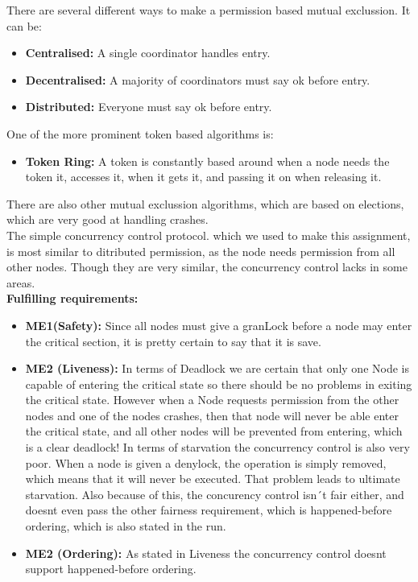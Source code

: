 There are several different ways to make a permission based mutual exclussion. It can be:
\begin{itemize}
\item \textbf{Centralised:} A single coordinator handles entry.
\item \textbf{Decentralised:} A majority of coordinators must say ok before entry.
\item \textbf{Distributed:} Everyone must say ok before entry. 
\end{itemize}  

One of the more prominent token based algorithms is:
\begin{itemize}
\item \textbf{Token Ring:} A token is constantly based around when a node needs the token it, accesses it, when it gets it, and passing it on when releasing it. 
\end{itemize} 

There are also other mutual exclussion algorithms, which are based on elections, which are very good at handling crashes. \\

The simple concurrency control protocol. which we used to make this assignment, is most similar to ditributed permission, as the node needs permission from all other nodes. Though they are very similar, the concurrency control lacks in some areas. \\

\textbf{Fulfilling requirements:}
\begin{itemize} 
\item \textbf{ME1(Safety):} Since all nodes must give a granLock before a node may enter the critical section, it is pretty certain to say that it is save. 
\item \textbf{ME2 (Liveness):} In terms of Deadlock we are certain that only one Node is capable of entering the critical state so there should be no problems in exiting the critical state. However when a Node requests permission from the other nodes and one of the nodes crashes, then that node will never be able enter the critical state, and all other nodes will be prevented from entering, which is a clear deadlock! In terms of starvation the concurrency control is also very poor. When a node is given a denylock, the operation is simply removed, which means that it will never be executed. That problem leads to ultimate starvation. Also because of this, the concurency control isn´t fair either, and doesnt even pass the other fairness requirement, which is happened-before ordering, which is also stated in the run.
\item \textbf{ME2 (Ordering):} As stated in Liveness the concurrency control doesnt support happened-before ordering.
\end{itemize}

